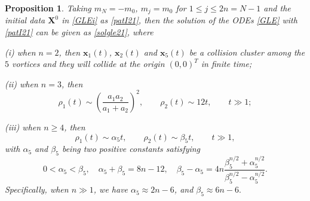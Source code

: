 \documentclass{aims}
\theoremstyle{plain}
\newtheorem{proposition}{Proposition}[section]
\theoremstyle{definition}
\newcommand{\bX}{{\mathbf X}}
\newcommand{\be} {\begin{equation}}
\newcommand{\ee}{\end{equation}}
\begin{document}
\begin{proposition}\label{lem6}
Taking $m_N=-m_0$, $m_j=m_0$  for $1\le j\le 2n=N-1$ and
the initial data $\bX^0$ in \eqref{GLEi} as
\eqref{patI21}, then the solution of the ODEs
\eqref{GLE} with \eqref{patI21} can be given as
 \eqref{solgle21},
where

(i) when $n=2$, then $\mathbf x_1(t)$, $\mathbf x_2(t)$ and $\mathbf x_5(t)$
be a collision cluster among the $5$ vortices and they will
collide at the origin $(0,0)^T$ in finite time;

(ii) when $n=3$, then
\be\label{p516}
\rho_1(t)\sim \left(\frac{a_1a_2}{a_1+a_2}\right)^2,
\qquad \rho_2(t)\sim 12t, \qquad t\gg1;
\ee

(iii) when $n\geq 4$, then
\be
\rho_1(t)\sim \alpha_5 t,\qquad
\rho_2(t)\sim \beta_5 t, \qquad t\gg 1, \nonumber
\ee
with $\alpha_5$ and $\beta_5$ being two positive constants satisfying
\be
0<\alpha_5< \beta_5, \quad \alpha_5+\beta_5=8n-12,\quad
\beta_5-\alpha_5=4n\frac{\beta_5^{n/2}+\alpha_5^{n/2}}
{\beta_5^{n/2}-\alpha_5^{n/2}}. \nonumber
\ee
Specifically, when $n\gg1$, we have $\alpha_5\approx 2n-6$, and $\beta_5\approx 6n-6.$
\end{proposition}
\end{document}
